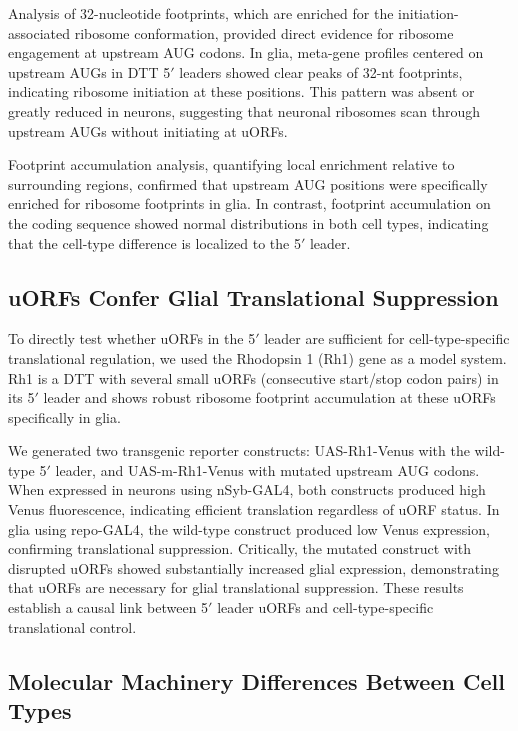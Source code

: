 \documentclass[12pt]{article}
\begin{document}
Analysis of 32-nucleotide footprints, which are enriched for the initiation-associated ribosome conformation, provided direct evidence for ribosome engagement at upstream AUG codons. In glia, meta-gene profiles centered on upstream AUGs in DTT 5$'$ leaders showed clear peaks of 32-nt footprints, indicating ribosome initiation at these positions. This pattern was absent or greatly reduced in neurons, suggesting that neuronal ribosomes scan through upstream AUGs without initiating at uORFs.

Footprint accumulation analysis, quantifying local enrichment relative to surrounding regions, confirmed that upstream AUG positions were specifically enriched for ribosome footprints in glia. In contrast, footprint accumulation on the coding sequence showed normal distributions in both cell types, indicating that the cell-type difference is localized to the 5$'$ leader.

\subsection{uORFs Confer Glial Translational Suppression}

To directly test whether uORFs in the 5$'$ leader are sufficient for cell-type-specific translational regulation, we used the Rhodopsin 1 (Rh1) gene as a model system. Rh1 is a DTT with several small uORFs (consecutive start/stop codon pairs) in its 5$'$ leader and shows robust ribosome footprint accumulation at these uORFs specifically in glia.

We generated two transgenic reporter constructs: UAS-Rh1-Venus with the wild-type 5$'$ leader, and UAS-m-Rh1-Venus with mutated upstream AUG codons. When expressed in neurons using nSyb-GAL4, both constructs produced high Venus fluorescence, indicating efficient translation regardless of uORF status. In glia using repo-GAL4, the wild-type construct produced low Venus expression, confirming translational suppression. Critically, the mutated construct with disrupted uORFs showed substantially increased glial expression, demonstrating that uORFs are necessary for glial translational suppression. These results establish a causal link between 5$'$ leader uORFs and cell-type-specific translational control.

\subsection{Molecular Machinery Differences Between Cell Types}
\end{document}
